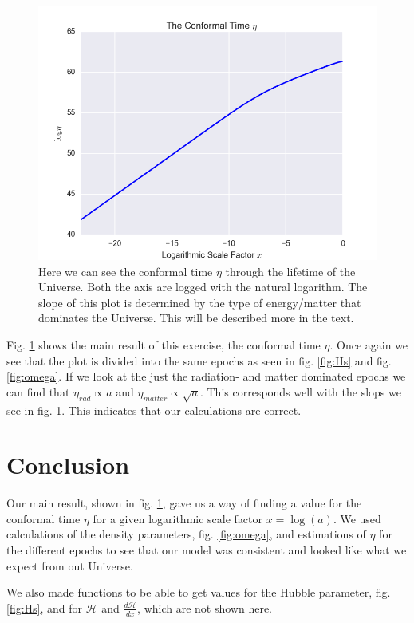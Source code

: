 \documentclass[a4paper,norsk, 10pt]{article}
\begin{document}
\begin{figure}[H]
     \centering
	{\includegraphics[scale=0.5]{eta.png}
	\caption{Here we can see the conformal time $\eta$ through the lifetime of the Universe. Both the axis are logged with the natural logarithm. The slope of this plot is determined by the type of energy/matter that dominates the Universe. This will be described more in the text. }\label{fig:eta}}
\end{figure}

Fig. \ref{fig:eta} shows the main result of this exercise, the conformal time $\eta$. Once again we see that the plot is divided into the same epochs as seen in fig. \ref{fig:Hs} and fig. \ref{fig:omega}. If we look at the just the radiation- and matter dominated epochs we can find that $\eta_{rad} \propto a$ and $\eta_{matter}\propto \sqrt{a}$. This corresponds well with the slops we see in fig. \ref{fig:eta}. This indicates that our calculations are correct.


\section{Conclusion}

Our main result, shown in fig. \ref{fig:eta}, gave us a way of finding a value for the conformal time $\eta$ for a given logarithmic scale factor $x = \log(a)$. We used calculations of the density parameters, fig. \ref{fig:omega}, and estimations of $\eta$ for the different epochs to see that our model was consistent and looked like what we expect from out Universe. 

We also made functions to be able to get values for the Hubble parameter, fig. \ref{fig:Hs}, and for $\mathcal{H}$ and $\frac{d\mathcal{H}}{dx}$, which are not shown here.
\end{document}
